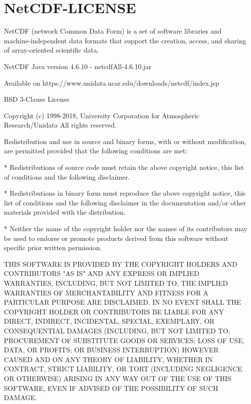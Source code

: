 \chapter{NetCDF-LICENSE} \label{NetCDF_LICENSE}

\parindent=0pt

\small


NetCDF (network Common Data Form) is a set of software libraries and
machine-independent data formats that support the creation, access,
and sharing of array-oriented scientific data.

NetCDF Java version 4.6.10 - netcdfAll-4.6.10.jar

Available on https://www.unidata.ucar.edu/downloads/netcdf/index.jsp

BSD 3-Clause License

Copyright (c) 1998-2018, University Corporation for Atmospheric Research/Unidata
All rights reserved.

Redistribution and use in source and binary forms, with or without
modification, are permitted provided that the following conditions are met:

* Redistributions of source code must retain the above copyright notice, this
  list of conditions and the following disclaimer.

* Redistributions in binary form must reproduce the above copyright notice,
  this list of conditions and the following disclaimer in the documentation
  and/or other materials provided with the distribution.

* Neither the name of the copyright holder nor the names of its
  contributors may be used to endorse or promote products derived from
  this software without specific prior written permission.

THIS SOFTWARE IS PROVIDED BY THE COPYRIGHT HOLDERS AND CONTRIBUTORS "AS IS"
AND ANY EXPRESS OR IMPLIED WARRANTIES, INCLUDING, BUT NOT LIMITED TO, THE
IMPLIED WARRANTIES OF MERCHANTABILITY AND FITNESS FOR A PARTICULAR PURPOSE ARE
DISCLAIMED. IN NO EVENT SHALL THE COPYRIGHT HOLDER OR CONTRIBUTORS BE LIABLE
FOR ANY DIRECT, INDIRECT, INCIDENTAL, SPECIAL, EXEMPLARY, OR CONSEQUENTIAL
DAMAGES (INCLUDING, BUT NOT LIMITED TO, PROCUREMENT OF SUBSTITUTE GOODS OR
SERVICES; LOSS OF USE, DATA, OR PROFITS; OR BUSINESS INTERRUPTION) HOWEVER
CAUSED AND ON ANY THEORY OF LIABILITY, WHETHER IN CONTRACT, STRICT LIABILITY,
OR TORT (INCLUDING NEGLIGENCE OR OTHERWISE) ARISING IN ANY WAY OUT OF THE USE
OF THIS SOFTWARE, EVEN IF ADVISED OF THE POSSIBILITY OF SUCH DAMAGE.

